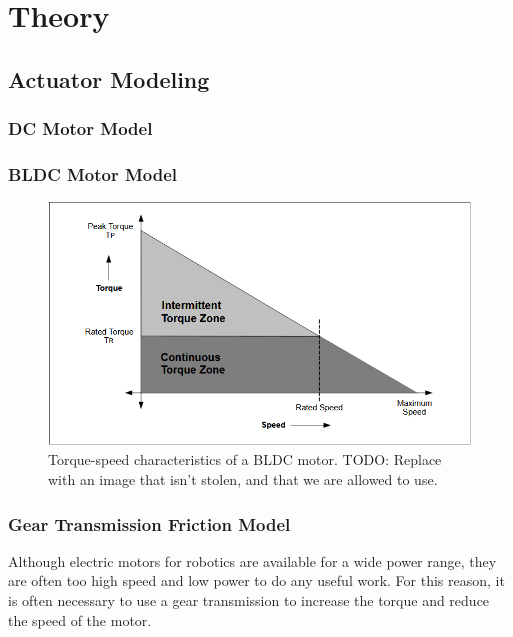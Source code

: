 \section{Theory}

\subsection{Actuator Modeling}
    \subsubsection{DC Motor Model}



    \subsubsection{BLDC Motor Model}
    \label{sec:bldc_theory}


    \begin{figure}[H]
        \centering
        \includegraphics[width=\textwidth]{Images/stolen_BLDC_torque_speed.png}
        \caption{Torque-speed characteristics of a BLDC motor. TODO: Replace with an image that isn't stolen, and that we are allowed to use. }
        \label{fig:bldc_torque_speed}
    \end{figure}

    \subsubsection{Gear Transmission Friction Model}

    Although electric motors for robotics are available for a wide power range, they are often too high speed and low power to do any useful work. For this reason, it is often necessary to use a gear transmission to increase the torque and reduce the speed of the motor. 

